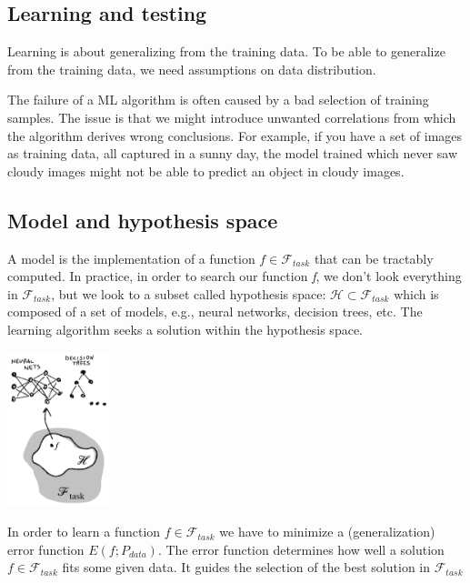\documentclass{article}
\begin{document}
\subsection*{Learning and testing}

Learning is about generalizing from the training data. To be able to generalize from the training data, we need assumptions on data distribution. 

The failure of a ML algorithm is often caused by a bad selection of training samples. The issue is that we might introduce unwanted correlations from which the algorithm derives wrong conclusions. For example, if you have a set of images as training data, all captured in a sunny day, the model trained which never saw cloudy images might not be able to predict an object in cloudy images.

\subsection*{Model and hypothesis space}

\begin{minipage}{0.55\linewidth}
A model is the implementation of a function \(f \in \mathcal{F}_{task}\) that can be tractably computed. In practice, in order to search our function \emph{f}, we don’t look everything in \(\mathcal{F}_{task}\), but we look to a subset called
hypothesis space: \(\mathcal{H} \subset \mathcal{F}_{task}\) which is composed of a set of models, e.g., neural networks, decision trees, etc. The learning algorithm seeks a solution within the hypothesis space.
\end{minipage}
\hfill
\begin{minipage}{0.35\linewidth}
	\includegraphics[width=3cm, height=4.5cm]{img/hyp_space.png}
\end{minipage}
	
	
\bigskip

In order to learn a function \(f \in \mathcal{F}_{task}\) we have to minimize a (generalization) error function \(E(f;P_{data})\). The error function determines how well a solution \(f \in \mathcal{F}_{task} \) fits some given data. It guides the selection of the best solution in \(\mathcal{F}_{task}\)
\end{document}
